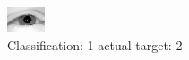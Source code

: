 \begin{figure}[h!]
\begin{center}
\includegraphics[width=0.60\columnwidth]{figures/ID2260_class_1_target_2.png}
\end{center}
\caption{ Classification: 1 actual target: 2}
\label{fig:ID2260_class_1_target_2}
\end{figure}
